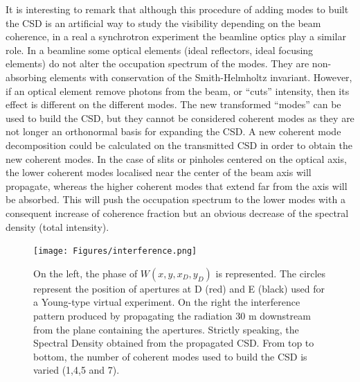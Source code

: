 \documentclass{iucr}              %
\begin{document}
It is interesting to remark that although this procedure of adding modes to built the CSD is an artificial way to study the visibility depending on the beam coherence, in a real a synchrotron experiment the beamline optics play a similar role. In a beamline some optical elements (ideal reflectors, ideal focusing elements) do not alter the occupation spectrum of the modes. They are non-absorbing elements with conservation of the Smith-Helmholtz invariant. However, if an optical element remove photons from the beam, or ``cuts'' intensity, then its effect is different on the different modes. The new transformed ``modes'' can be used to build the CSD, but they cannot be considered coherent modes as they are not longer an orthonormal basis for expanding the CSD. A new coherent mode decomposition could be calculated on the transmitted CSD in order to obtain the new coherent modes. In the case of slits or pinholes centered on the optical axis, the lower coherent modes localised near the center of the beam axis will propagate, whereas the higher coherent modes that extend far from the axis will be absorbed. This will push the occupation spectrum to the lower modes with a consequent increase of coherence fraction but an obvious decrease of the spectral density (total intensity).     

\begin{figure}
\caption{On the left, the phase of $W(x,y,x_{D},y_{D})$ is represented. The circles represent the position of apertures at D (red) and E (black) used for a Young-type virtual experiment. On the right the interference pattern produced by propagating the radiation 30 m downstream from the plane containing the apertures. Strictly speaking, the Spectral Density obtained from the propagated CSD. From top to bottom, the number of coherent modes used to build the CSD is varied (1,4,5 and 7).}
\texttt{[image: Figures/interference.png]}
%
%
%
%
%
%
\label{young}
\end{figure}
\end{document}
